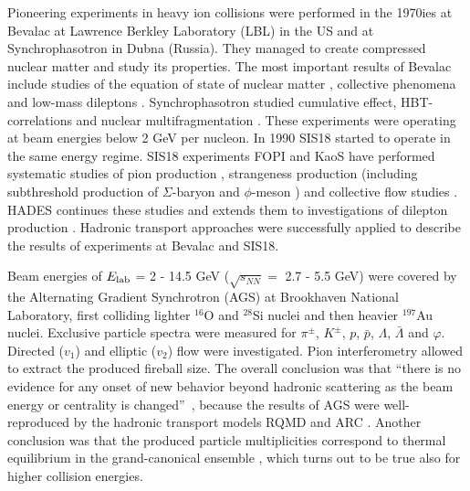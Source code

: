 Pioneering experiments in heavy ion collisions were performed in the 1970ies at
Bevalac at Lawrence Berkley Laboratory (LBL) in the US and at Synchrophasotron in
Dubna (Russia). They managed to create compressed nuclear matter and study
its properties. The most important results of Bevalac include studies of the
equation of state of nuclear matter \cite{Brown:1990pp}, collective phenomena
\cite{Doss:1986eh,Gustafsson:1984ka} and low-mass dileptons
\cite{Roche:1988er}.  Synchrophasotron studied cumulative effect,
HBT-correlations\cite{Lisa:2005dd} and nuclear multifragmentation
\cite{Kuznetsov:1982zc}.  These
experiments were operating at beam energies below 2 GeV per
nucleon. In 1990 SIS18 started to operate in the same energy regime. SIS18
experiments FOPI and KaoS have performed systematic studies of pion production
\cite{Reisdorf:2006ie}, strangeness production
\cite{Laue:1999yv,Wisniewski:2001dk} (including subthreshold production of
$\Sigma$-baryon \cite{Lopez:2007zz} and $\phi$-meson \cite{Mangiarotti:2002mw})
and collective flow studies \cite{Andronic:2000cx}.  HADES continues these
studies \cite{Stroth:2017blf} and extends them to investigations of dilepton
production \cite{Agakishiev:2011vf,Franco:2017ano}. Hadronic transport approaches were
successfully applied to describe the results of experiments at Bevalac and
SIS18.

Beam energies of $E_\mathrm{lab}$ = 2 - 14.5 GeV ($\sqrt{s_{NN}} = $ 2.7 -
5.5 GeV) were covered by the Alternating Gradient Synchrotron (AGS) at
Brookhaven National Laboratory, first colliding lighter $^{16}$O and $^{28}$Si
nuclei and then heavier $^{197}$Au nuclei.  Exclusive particle spectra
\cite{Ahle:2000wq,Ahle:1999va,Ogilvie:1997mb} were measured for $\pi^{\pm}$,
$K^{\pm}$, $p$, $\bar{p}$, $\Lambda$, $\bar{\Lambda}$ and $\varphi$. Directed
($v_1$) \cite{Barrette:1995cv} and  elliptic ($v_2$) flow
\cite{Barrette:1996rs} were investigated.  Pion interferometry
\cite{Lisa:2000xj} allowed to extract the produced fireball size. The overall
conclusion was that ``there is no evidence for any onset of new behavior beyond
hadronic scattering as the beam energy or centrality is
changed''~\cite{Kahana:1997aq}, because the results of AGS were well-reproduced
by the hadronic transport models RQMD and ARC \cite{Kahana:1997aq}. Another
conclusion was that the produced particle multiplicities correspond to thermal
equilibrium in the grand-canonical ensemble \cite{BraunMunzinger:1994xr}, which
turns out to be true also for higher collision energies.

